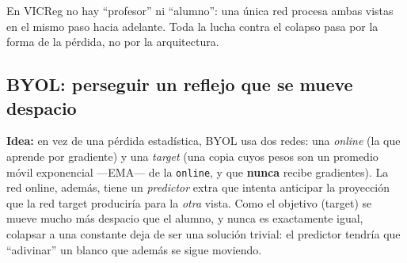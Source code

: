 \documentclass[11pt,a4paper]{article}
\begin{document}
\begin{ideabox}
En VICReg no hay ``profesor'' ni ``alumno'': una única red procesa ambas
vistas en el mismo paso hacia adelante. Toda la lucha contra el colapso pasa
por la forma de la pérdida, no por la arquitectura.
\end{ideabox}

\subsection{BYOL: perseguir un reflejo que se mueve despacio}

\textbf{Idea:} en vez de una pérdida estadística, BYOL usa dos redes: una
\emph{online} (la que aprende por gradiente) y una \emph{target} (una copia
cuyos pesos son un promedio móvil exponencial ---EMA--- de la \texttt{online},
y que \textbf{nunca} recibe gradientes). La red online, además, tiene un
\emph{predictor} extra que intenta anticipar la proyección que la red target
produciría para la \emph{otra} vista. Como el objetivo (target) se mueve
mucho más despacio que el alumno, y nunca es exactamente igual, colapsar a
una constante deja de ser una solución trivial: el predictor tendría que
``adivinar'' un blanco que además se sigue moviendo.
\end{document}
